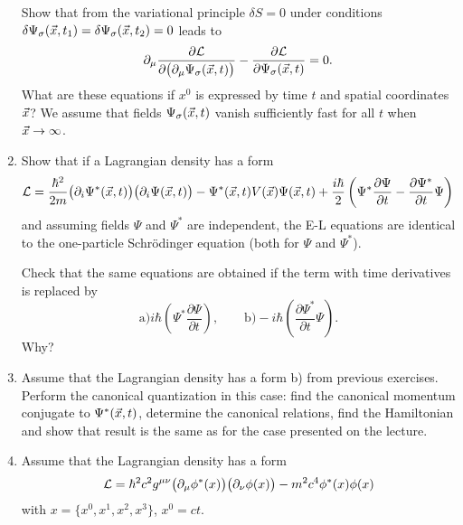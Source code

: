 \documentclass[a4paper,11pt]{article}
\begin{document}
\begin{enumerate}
  Show that from the variational principle $\delta S = 0$ under conditions
  $\delta \Psi_{ \sigma }( \vec{ x }, t_{ 1 } ) = \delta \Psi_{ \sigma }(
  \vec{ x }, t_{ 2 } ) = 0$ leads to
  \begin{equation}
    \label{eq:QM34}
    \partial_{ \mu } \frac{ \partial \mathcal{L} }{ \partial \big( \partial_{ \mu } \Psi_{ \sigma }( \vec{ x }, t ) \big) }
    - \frac{ \partial \mathcal{L} }{ \partial \Psi_{ \sigma }( \vec{ x }, t ) }
    = 0.
  \end{equation}
  What are these equations if $x^{ 0 }$ is expressed by time $t$ and
  spatial coordinates $\vec{ x }$? We assume that fields
  $\Psi_{ \sigma }( \vec{ x }, t )$ vanish sufficiently fast for all $t$
  when $\vec{ x } \to \infty$.

\item Show that if a Lagrangian density has a form
  \begin{equation}
    \label{eq:QM35}
    \mathcal{L} =
    \frac{ \hbar^{ 2 } }{ 2m } \big( \partial_{ i } \Psi^{ * }( \vec{ x }, t ) \big)
    \big( \partial_{ i } \Psi( \vec{ x }, t ) \big)
    - \Psi^{ * }( \vec{ x }, t ) V( \vec{ x } ) \Psi( \vec{ x }, t )
    + \frac{ i \hbar }{ 2 } \left( \Psi^{ * } \frac{ \partial \Psi }{ \partial t }
      - \frac{ \partial \Psi^{ * } }{ \partial t } \Psi \right)
  \end{equation}
  and assuming fields $\Psi$ and $\Psi^{ * }$ are independent, the E-L
  equations are identical to the one-particle Schr\"{o}dinger equation
  (both for $\Psi$ and $\Psi^{ * }$).

  Check that the same equations are obtained if the term with time
  derivatives is replaced by
  \begin{equation}
    \label{eq:QM36}
    \textrm{a)} i \hbar \left( \Psi^{ * } \frac{ \partial \Psi }{ \partial t } \right), \qquad
    \textrm{b)} -i \hbar \left( \frac{ \partial \Psi^{ * } }{ \partial t } \Psi \right).
  \end{equation}
  Why?

\item Assume that the Lagrangian density has a form b) from previous
  exercises. Perform the canonical quantization in this case: find the
  canonical momentum conjugate to $\Psi^{ * }( \vec{ x }, t )$, determine
  the canonical relations, find the Hamiltonian and show that result
  is the same as for the case presented on the lecture.

\item Assume that the Lagrangian density has a form
  \begin{equation}
    \label{eq:QM37}
    \mathcal{L} =
    \hbar^{ 2 } c^{ 2 } g^{ \mu \nu } \big( \partial_{ \mu } \phi^{ * }( x ) \big)
    \big( \partial_{ \nu } \phi( x ) \big)
    - m^{ 2 } c^{ 4 } \phi^{ * }( x ) \phi( x )
  \end{equation}
  with $x = \{ x^{ 0 }, x^{ 1 }, x^{ 2 }, x^{ 3 } \}$,
  $x^{ 0 } = c t$.


\end{enumerate}
\end{document}
